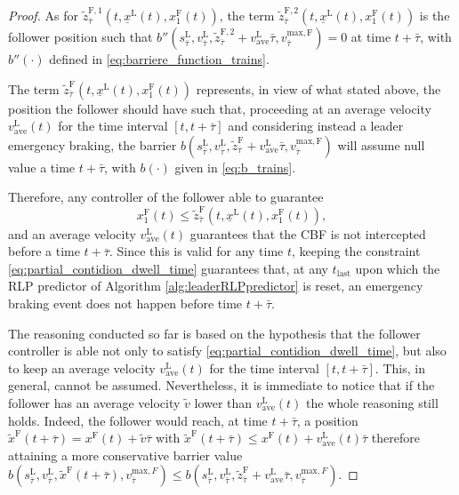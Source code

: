 \documentclass[letterpaper, 10 pt, conference]{ieeeconf}
\theoremstyle{definition}
\theoremstyle{nopoint}
\begin{document}
\begin{proof}
As for $\tilde{z}^{\mathrm{F},1}_{\bar{\tau}} (t,\underline{x}^\mathrm{L}(t),x_1^\mathrm{F}(t))$, the term $\tilde{z}^{\mathrm{F},2}_{\bar{\tau}} (t,\underline{x}^\mathrm{L}(t),x_1^\mathrm{F}(t))$ is the follower position such that $b''(s_{\bar{\tau}}^\mathrm{L},v_{\bar{\tau}}^\mathrm{L},\tilde{z}^{\mathrm{F},2}_{\bar{\tau}}+v_{\mathrm{ave}}^\mathrm{L}\bar{\tau},v_{\bar{\tau}}^{\mathrm{max}, \mathrm{F}})=0$ at time $t+\bar{\tau}$, with $b''(\cdot)$ defined in \eqref{eq:barriere_function_trains}.

The term $\tilde{z}^{\mathrm{F}}_{\bar{\tau}} (t,\underline{x}^\mathrm{L}(t),x_1^\mathrm{F}(t))$ represents, in view of what stated above, the position the follower should have such that, proceeding at an average velocity $v_{\mathrm{ave}}^\mathrm{L}(t)$ for the time interval $[t, t+\bar{\tau}]$ and considering instead a leader emergency braking, the barrier $b(s_{\bar{\tau}}^\mathrm{L},v_{\bar{\tau}}^\mathrm{L},\tilde{z}^{\mathrm{F}}_{\bar{\tau}}+v_{\mathrm{ave}}^\mathrm{L}\bar{\tau},v_{\bar{\tau}}^{\mathrm{max}, \mathrm{F}})$ will assume null value a time $t+\bar{\tau}$, with $b(\cdot)$ given in \eqref{eq:b_trains}.

Therefore, any controller of the follower able to guarantee
\begin{equation}\label{eq:partial_contidion_dwell_time}
x_1^\mathrm{F}(t)\leq \tilde{z}^{\mathrm{F}}_{\bar{\tau}} (t,\underline{x}^\mathrm{L}(t),x_1^\mathrm{F}(t)), 
\end{equation}
and an average velocity $v_{\mathrm{ave}}^\mathrm{L}(t)$ guarantees that the CBF is not intercepted before a time $t+\bar{\tau}$. Since this is valid for any time $t$, keeping the constraint \eqref{eq:partial_contidion_dwell_time} guarantees that, at any $t_{\mathrm{last}}$ upon which the RLP predictor of Algorithm \ref{alg:leaderRLPpredictor} is reset, an emergency braking event does not happen before time $t+\bar{\tau}$. 

The reasoning conducted so far is based on the hypothesis that the follower controller is able not only to satisfy \eqref{eq:partial_contidion_dwell_time}, but also to keep an average velocity $v_{\mathrm{ave}}^\mathrm{L}(t)$ for the time interval $[t, t+\bar{\tau}]$. This, in general, cannot be assumed. Nevertheless, it is immediate to notice that if the follower has an average velocity $\tilde{v}$ lower than $v_{\mathrm{ave}}^\mathrm{L}(t)$  the whole reasoning still holds. Indeed, the follower would reach, at time $t+\bar{\tau}$, a position $\tilde{x}^\mathrm{F}(t+\bar{\tau})=x^{\mathrm{F}}(t)+\tilde{v}\bar{\tau}$ with $\tilde{x}^\mathrm{F}(t+\bar{\tau})\leq x^{\mathrm{F}}(t)+v_{\mathrm{ave}}^\mathrm{L}(t)\bar{\tau} $ therefore attaining a more conservative barrier value
$b(s_{\bar{\tau}}^\mathrm{L},v_{\bar{\tau}}^\mathrm{L},\tilde{x}^\mathrm{F}(t+\bar{\tau}),v_{\bar{\tau}}^{\mathrm{max}, F})\leq b(s_{\bar{\tau}}^\mathrm{L},v_{\bar{\tau}}^\mathrm{L},\tilde{z}^{\mathrm{F}}_{\bar{\tau}}+v_{\mathrm{ave}}^\mathrm{L}\bar{\tau} ,v_{\bar{\tau}}^{\mathrm{max}, F})$.


\end{proof}
\end{document}
